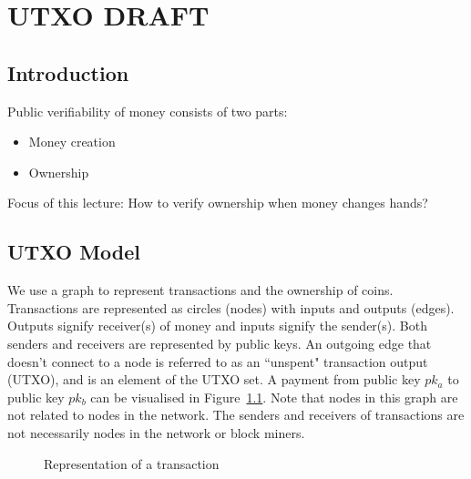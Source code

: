 \chapter{UTXO \small{\textsf{DRAFT}}}

\section{Introduction}
Public verifiability of money consists of two parts:
\begin{itemize}
    \item Money creation
    \item Ownership
\end{itemize}
Focus of this lecture: How to verify ownership when money changes hands?
\section{UTXO Model}
We use a graph to represent transactions and the ownership of coins.
Transactions are represented as circles (nodes) with inputs and outputs (edges). Outputs signify receiver(s) of money and inputs signify the sender(s). Both senders and receivers are represented by public keys. An outgoing edge that doesn't connect to a node is referred to as an ``unspent" transaction output (UTXO), and is an element of the UTXO set. A payment from public key $pk_a$ to public key $pk_b$ can be visualised in Figure~\ref{fig:tx_model}.
Note that nodes in this graph are not related to nodes in the network. The senders and receivers of transactions are not necessarily nodes in the network or block miners.

\begin{figure}[h]
\begin{center}
\end{center}
\caption{Representation of a transaction}
\label{fig:tx_model}
\end{figure}


